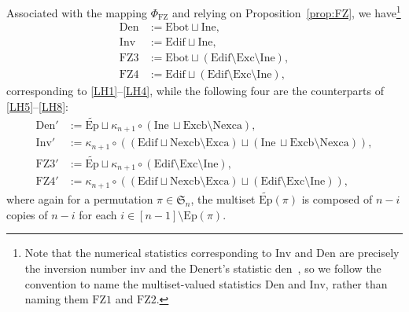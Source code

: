 \documentclass[12pt]{amsart}
\numberwithin{equation}{section}
\theoremstyle{plain}
\theoremstyle{definition}
\def\FZ{\mathrm{FZ}}
\def\SS{\mathfrak{S}}
\def\Edif{\mathrm{Edif}}
\def\Excp{\mathrm{Ep}}
\def\Exc{\mathrm{Exc}}
\def\Nexcb{\mathrm{Nexcb}}
\def\Nexca{\mathrm{Nexca}}
\def\Excb{\mathrm{Excb}}
\def\Exca{\mathrm{Exca}}
\def\Ine{\mathrm{Ine}}
\def\Ebot{\mathrm{Ebot}}
\def\Inv{\mathrm{Inv}}
\def\Den{\mathrm{Den}}
\def\FZthree{\mathrm{FZ3}}
\def\FZfour{\mathrm{FZ4}}
\def\inv{\mathrm{inv}}
\def\den{\mathrm{den}}
\def\inv{\mathrm{inv}}
\begin{document}
Associated with the mapping $\Phi_{\FZ}$ and relying on Proposition~\ref{prop:FZ}, we have\footnote{Note that the numerical statistics corresponding to $\Inv$ and $\Den$ are precisely the inversion number $\inv$ and the Denert's statistic $\den$~\cite{FZ90}, so we follow the convention to name the multiset-valued statistics $\Den$ and $\Inv$, rather than naming them $\FZ1$ and $\FZ2$.}
\begin{align*}
  \Den & :=\Ebot \sqcup \Ine, \\
  \Inv & :=\Edif \sqcup \Ine,\\
  \FZthree & :=\Ebot \sqcup
  (\Edif \setminus \Exc \setminus \Ine), \\
  \FZfour & :=\Edif \sqcup (\Edif \setminus \Exc \setminus \Ine),
\end{align*}
corresponding to \eqref{LH1}--\eqref{LH4}, while the following four are the counterparts of \eqref{LH5}--\eqref{LH8}:
\begin{align*}
\Den'& :=\widetilde{\Excp }\sqcup\kappa_{n+1}\circ(\Ine \, \sqcup  \Excb \setminus\Nexca),\\
\Inv'& :=\kappa_{n+1}\circ((\Edif \sqcup \Nexcb \setminus \Exca) \sqcup(\Ine \, \sqcup  \Excb \setminus\Nexca)),  \\
\FZthree'& :=\widetilde{\Excp  } \sqcup \kappa_{n+1}\circ(\Edif\setminus \Exc \setminus \Ine),\\
\FZfour'& :=\kappa_{n+1}\circ((\Edif \sqcup \Nexcb \setminus \Exca) \sqcup   (\Edif\setminus \Exc \setminus \Ine)),
\end{align*}
where again for a permutation $\pi\in\SS_n$, the multiset $\widetilde{\Excp}(\pi)$ is composed of $n-i$ copies of $n-i$ for each $i\in[n-1]\setminus\Excp(\pi)$.
\end{document}
